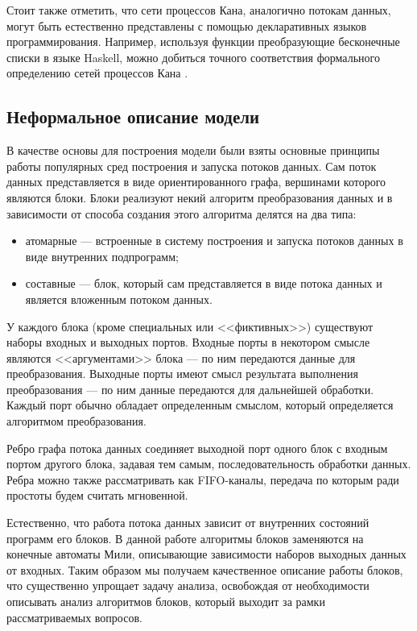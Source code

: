\documentclass[10pt,a4paper]{article}
\begin{document}
Стоит также отметить, что сети процессов Кана, аналогично потокам данных,
могут быть естественно представлены с помощью декларативных языков программирования.
Например, используя функции преобразующие бесконечные списки в языке Haskell, можно добиться точного соответствия формального определению сетей процессов Кана \cite{data-flow-process-networks}. 

\subsection{Неформальное описание модели}

В качестве основы для построения модели были взяты основные принципы работы популярных сред построения и запуска потоков данных.
Сам поток данных представляется в виде ориентированного графа, вершинами которого являются блоки.
Блоки реализуют некий алгоритм преобразования данных и в зависимости от способа создания этого алгоритма делятся на два типа:
\begin{itemize}
  \item атомарные --- встроенные в систему построения и запуска потоков данных в виде внутренних подпрограмм;
  \item составные --- блок, который сам представляется в виде потока данных и является вложенным потоком данных.
\end{itemize}
У каждого блока (кроме специальных или <<фиктивных>>) существуют наборы входных и выходных портов. Входные порты в некотором смысле являются <<аргументами>> блока ---
по ним передаются данные для преобразования. Выходные порты имеют смысл результата выполнения преобразования --- по ним данные передаются для дальнейшей обработки.
Каждый порт обычно обладает определенным смыслом, который определяется алгоритмом преобразования.

Ребро графа потока данных соединяет выходной порт одного блок с входным портом другого блока, задавая тем самым, последовательность обработки данных.
Ребра можно также рассматривать как FIFO-каналы, передача по которым ради простоты будем считать мгновенной.

Естественно, что работа потока данных зависит от внутренних состояний программ его блоков. В данной работе алгоритмы блоков заменяются на конечные автоматы Мили,
описывающие зависимости наборов выходных данных от входных. Таким образом мы получаем качественное описание работы блоков, что существенно упрощает
задачу анализа, освобождая от необходимости описывать анализ алгоритмов блоков, который выходит за рамки рассматриваемых вопросов.
\end{document}
